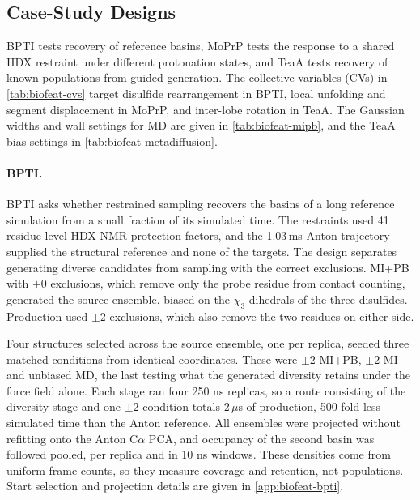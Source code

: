 \subsection{Case-Study Designs}
\label{sec:biofeat-cases}

BPTI tests recovery of reference basins, MoPrP tests the response to a shared HDX restraint under different protonation states, and TeaA tests recovery of known populations from guided generation. The collective variables (CVs) in \cref{tab:biofeat-cvs} target disulfide rearrangement in BPTI, local unfolding and segment displacement in MoPrP, and inter-lobe rotation in TeaA. The Gaussian widths and wall settings for MD are given in \cref{tab:biofeat-mipb}, and the TeaA bias settings in \cref{tab:biofeat-metadiffusion}.

\paragraph{BPTI.}
BPTI asks whether restrained sampling recovers the basins of a long reference simulation from a small fraction of its simulated time. The restraints used 41 residue-level HDX-NMR protection factors, and the 1.03\,ms Anton trajectory\supercite{shawAtomiclevelCharacterizationStructural2010} supplied the structural reference and none of the targets. The design separates generating diverse candidates from sampling with the correct exclusions. MI+PB with $\pm0$ exclusions, which remove only the probe residue from contact counting, generated the source ensemble, biased on the $\chi_3$ dihedrals of the three disulfides. Production used $\pm2$ exclusions, which also remove the two residues on either side.

Four structures selected across the source ensemble, one per replica, seeded three matched conditions from identical coordinates. These were $\pm2$ MI+PB, $\pm2$ MI and unbiased MD, the last testing what the generated diversity retains under the force field alone. Each stage ran four 250 ns replicas, so a route consisting of the diversity stage and one $\pm2$ condition totals 2\,$\mu$s of production, 500-fold less simulated time than the Anton reference. All ensembles were projected without refitting onto the Anton C$\alpha$ PCA, and occupancy of the second basin was followed pooled, per replica and in 10 ns windows. These densities come from uniform frame counts, so they measure coverage and retention, not populations. Start selection and projection details are given in \cref{app:biofeat-bpti}.

